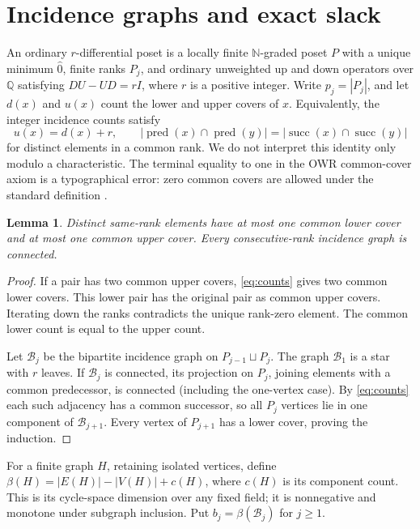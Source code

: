\documentclass[11pt]{article}
\newtheorem{lemma}[theorem]{Lemma}
\theoremstyle{remark}
\newcommand{\N}{\mathbb N}
\newcommand{\Q}{\mathbb Q}
\newcommand{\B}{\mathcal B}
\newcommand{\pred}{\operatorname{pred}}
\newcommand{\succs}{\operatorname{succ}}
\begin{document}
\newpage
\section{Incidence graphs and exact slack}
An ordinary $r$-differential poset is a locally finite $\N$-graded poset $P$
with a unique minimum $\widehat0$, finite ranks $P_j$, and ordinary unweighted
up and down operators over $\Q$ satisfying $DU-UD=rI$, where $r$ is a positive
integer. Write $p_j=|P_j|$, and let $d(x)$ and $u(x)$ count the lower and upper
covers of $x$. Equivalently, the integer incidence counts satisfy
\begin{equation}\label{eq:counts}
 u(x)=d(x)+r,\qquad
 |\pred(x)\cap\pred(y)|=|\succs(x)\cap\succs(y)|
\end{equation}
for distinct elements in a common rank. We do not interpret this identity
only modulo a characteristic. The terminal equality to one in the OWR
common-cover axiom is a typographical error: zero common covers are allowed
under the standard definition \cite{Stanley,GV}.

\begin{lemma}\label{lem:basic}
Distinct same-rank elements have at most one common lower cover and at most
one common upper cover. Every consecutive-rank incidence graph is connected.
\end{lemma}
\begin{proof}
If a pair has two common upper covers, \eqref{eq:counts} gives two common
lower covers. This lower pair has the original pair as common upper covers.
Iterating down the ranks contradicts the unique rank-zero element. The
common lower count is equal to the upper count.

Let $\B_j$ be the bipartite incidence graph on $P_{j-1}\sqcup P_j$.
The graph $\B_1$ is a star with $r$ leaves. If $\B_j$ is connected, its
projection on $P_j$, joining elements with a common predecessor, is connected
(including the one-vertex case). By \eqref{eq:counts} each such adjacency has
a common successor, so all $P_j$ vertices lie in one component of $\B_{j+1}$.
Every vertex of $P_{j+1}$ has a lower cover, proving the induction.
\end{proof}

For a finite graph $H$, retaining isolated vertices, define
$\beta(H)=|E(H)|-|V(H)|+c(H)$, where $c(H)$ is its component count.
This is its cycle-space dimension over any fixed field; it is nonnegative
and monotone under subgraph inclusion. Put $b_j=\beta(\B_j)$ for $j\ge1$.
\end{document}
